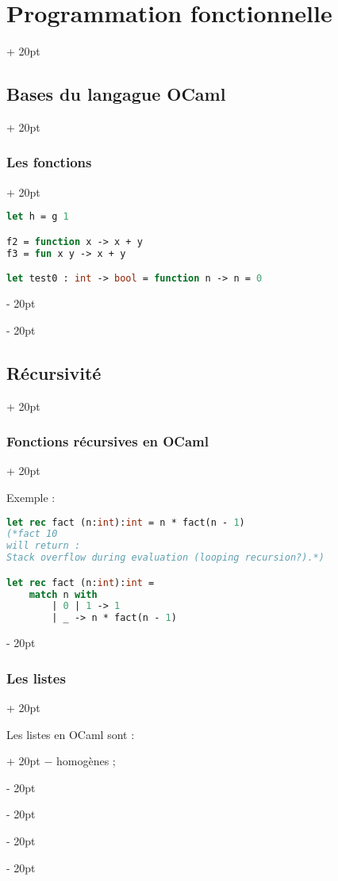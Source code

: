\documentclass[a4paper, 12pt, twoside]{article}
\newcommand{\ind}[1][20pt]{\advance\leftskip + #1}
\newcommand{\deind}[1][20pt]{\advance\leftskip - #1}
\newenvironment{indentedenv}[1][20pt]{\par \ind[#1]}{\par \deind}
\newenvironment{indt}[2][20pt]{#2 \begin{indentedenv}[#1]}{\end{indentedenv}} %
\begin{document}
\begin{indt}{\section{Programmation fonctionnelle}}
\begin{indt}{\subsection{Bases du langague OCaml}}
\begin{indt}{\subsubsection{Les fonctions}}
\begin{lstlisting}[language=Caml, xleftmargin=80pt]
let h = g 1

f2 = function x -> x + y
f3 = fun x y -> x + y

let test0 : int -> bool = function n -> n = 0
                \end{lstlisting}
                
            \end{indt}
            
        \end{indt}
        
        \vspace{12pt}
        
        \begin{indt}{\subsection{Récursivité}}
            
            \begin{indt}{\subsubsection{Fonctions récursives en OCaml}}
                
                Exemple :
                
                \begin{lstlisting}[language=Caml, xleftmargin=80pt]
let rec fact (n:int):int = n * fact(n - 1)
(*fact 10
will return :
Stack overflow during evaluation (looping recursion?).*)

let rec fact (n:int):int =
    match n with
        | 0 | 1 -> 1
        | _ -> n * fact(n - 1)
                \end{lstlisting}
                
            \end{indt}
            
            \vspace{12pt}
            
            \begin{indt}{\subsubsection{Les listes}}
                
                \begin{indt}{Les listes en OCaml sont :}
                    $-$ homogènes ;
                    

\end{indt}
\end{indt}
\end{indt}
\end{indt}
\end{document}

